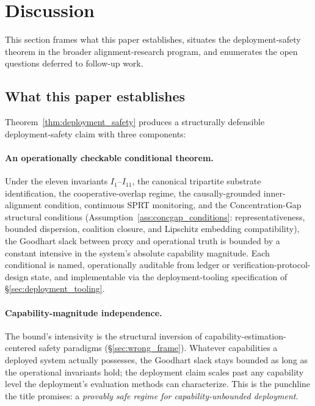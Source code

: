 \section{Discussion}
\label{sec:discussion}

This section frames what this paper establishes, situates the
deployment-safety theorem in the broader alignment-research
program, and enumerates the open questions deferred to follow-up
work.

\subsection{What this paper establishes}
\label{sec:disc_establishes}

Theorem~\ref{thm:deployment_safety} produces a structurally
defensible deployment-safety claim with three components:

\paragraph{An operationally checkable conditional theorem.}
Under the eleven invariants $I_1$--$I_{11}$, the canonical
tripartite substrate identification, the cooperative-overlap
regime, the causally-grounded inner-alignment condition, continuous
SPRT monitoring, and the Concentration-Gap structural conditions
(Assumption~\ref{ass:concgap_conditions}: representativeness,
bounded dispersion, coalition closure, and Lipschitz embedding
compatibility), the Goodhart slack between proxy and
operational truth is bounded by a constant intensive in the
system's absolute capability magnitude. Each conditional is
named, operationally auditable from ledger or
verification-protocol-design state, and implementable via the
deployment-tooling specification of
\S\ref{sec:deployment_tooling}.

\paragraph{Capability-magnitude independence.}
The bound's intensivity is the structural inversion of
capability-estimation-centered safety paradigms
(\S\ref{sec:wrong_frame}). Whatever capabilities a deployed system
actually possesses, the Goodhart slack stays bounded as long as
the operational invariants hold; the deployment claim scales past
any capability level the deployment's evaluation methods can
characterize. This is the punchline the title promises: a
\emph{provably safe regime for capability-unbounded deployment}.

